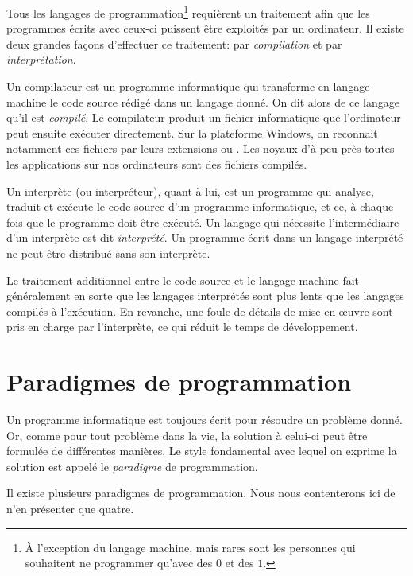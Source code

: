 Tous les langages de programmation\footnote{%
  À l'exception du langage machine, mais rares sont les personnes qui
  souhaitent ne programmer qu'avec des $0$ et des $1$.} %
requièrent un traitement afin que les programmes écrits avec ceux-ci
puissent être exploités par un ordinateur. Il existe deux grandes
façons d'effectuer ce traitement: par \emph{compilation} et par
\emph{interprétation}.

Un compilateur est un programme informatique qui transforme en langage
machine le code source rédigé dans un langage donné. On dit alors de
ce langage qu'il est \emph{compilé}. Le compilateur produit un fichier
informatique que l'ordinateur peut ensuite exécuter directement. Sur
la plateforme Windows, on reconnait notamment ces fichiers par leurs
extensions  ou . Les noyaux d'à peu près toutes
les applications sur nos ordinateurs sont des fichiers compilés.

Un interprète (ou interpréteur), quant à lui, est un programme qui
analyse, traduit et exécute le code source d'un programme
informatique, et ce, à chaque fois que le programme doit être exécuté.
Un langage qui nécessite l'intermédiaire d'un interprète est dit
\emph{interprété}. Un programme écrit dans un langage interprété ne
peut être distribué sans son interprète.

Le traitement additionnel entre le code source et le langage machine
fait généralement en sorte que les langages interprétés sont plus
lents que les langages compilés à l'exécution. En revanche, une foule
de détails de mise en œuvre sont pris en charge par l'interprète, ce
qui réduit le temps de développement.


\section{Paradigmes de programmation}
\label{sec:informatique:paradigmes}

Un programme informatique est toujours écrit pour résoudre un problème
donné. Or, comme pour tout problème dans la vie, la solution à
celui-ci peut être formulée de différentes manières. Le style
fondamental avec lequel on exprime la solution est appelé le
\emph{paradigme} de programmation.

Il existe plusieurs paradigmes de programmation. Nous nous
contenterons ici de n'en présenter que quatre.

